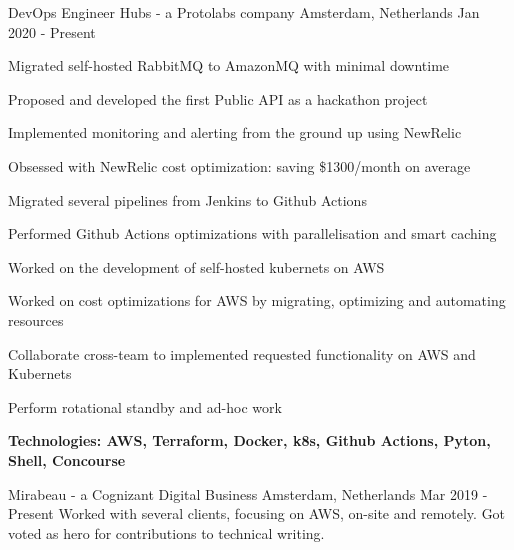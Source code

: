 


\begin{cventries}

\cventry
{DevOps Engineer} %
{Hubs - a Protolabs company} %
{Amsterdam, Netherlands} %
{Jan 2020 - Present} %
{ %
	\begin{cvitems}
		\item {Migrated self-hosted RabbitMQ to AmazonMQ with minimal downtime}
		\item {Proposed and developed the first Public API as a hackathon project}
		\item {Implemented monitoring and alerting from the ground up using NewRelic}
		\item {Obsessed with NewRelic cost optimization: saving \$1300/month on average}
		\item {Migrated several pipelines from Jenkins to Github Actions}
		\item {Performed Github Actions optimizations with parallelisation and smart caching}
		\item {Worked on the development of self-hosted kubernets on AWS}
		\item {Worked on cost optimizations for AWS by migrating, optimizing and automating resources}
		\item {Collaborate cross-team to implemented requested functionality on AWS and Kubernets}
		\item {Perform rotational standby and ad-hoc work}
		\item {\bfseries{Technologies:} AWS, Terraform, Docker, k8s, Github Actions, Pyton, Shell, Concourse}
	\end{cvitems}
}


{Mirabeau - a Cognizant Digital Business}
{Amsterdam, Netherlands}
{Mar 2019 - Present}
{Worked with several clients, focusing on AWS, on-site and remotely. Got voted as hero for contributions to technical writing.}


\end{cventries}
